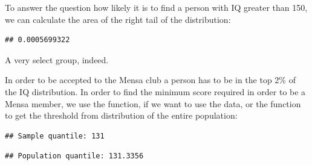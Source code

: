 To answer the question how likely  it is to find a person with IQ greater than 150, we can calculate the area of the right tail of the distribution:

\begin{knitrout}
\color{fgcolor}\begin{kframe}
\begin{alltt}
\hlstd{(}\hlopt{-}\hlstd{(}\hlstd{,} \hlstd{=} \hlstd{=}\hlstd{)}
\end{alltt}
\begin{verbatim}
## 0.0005699322
\end{verbatim}
\end{kframe}
\end{knitrout}
A very select group, indeed.

In order to be accepted to the Mensa club a person has to be in the top 2\% of the IQ distribution. In order to find the minimum score required in order to be a Mensa member, we use the  function, if we want to use the data, or the  function to get the threshold from distribution of the entire population:

\begin{knitrout}
\color{fgcolor}\begin{kframe}
\begin{alltt}
 \hlkwb{<-} \hlstd{(} \hlstd{=} \hlstd{))}
\hlstd{(}\hlstd{)}
\end{alltt}
\begin{verbatim}
## Sample quantile: 131
\end{verbatim}
\begin{alltt}
\hlstd{(}\hlstd{,} \hlstd{(}\hlstd{,} \hlstd{=} \hlstd{=}\hlstd{)}
\end{alltt}
\begin{verbatim}
## Population quantile: 131.3356
\end{verbatim}
\end{kframe}
\end{knitrout}


